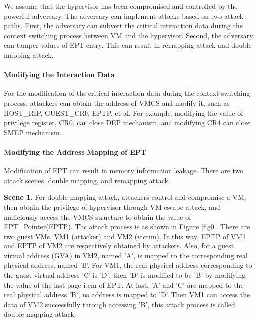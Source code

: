 \documentclass[conference]{IEEEtran}
\begin{document}

We assume that the hypervisor has been compromised and controlled by the powerful adversary. The adversary can implement attacks based on two attack paths. 
First, the adversary can subvert the critical interaction data during the context switching process between VM and the hypervisor. Second, the adversary can tamper values of EPT entry. This can result in remapping attack and double mapping attack.

\paragraph{Modifying the Interaction Data}
For the modification of the critical interaction data during the context switching process, attackers can obtain the address of VMCS
and modify it, such as HOST\_RIP, GUEST\_CR0, EPTP, et al. For example,
modifying the value of privilege register, CR0, can close DEP mechanism, and modifying CR4 can close SMEP mechanism.

\paragraph{Modifying the Address Mapping of EPT}
Modification of EPT can result in memory information leakage. There are two attack scenes, double mapping, and remapping attack.

\textbf{Scene 1.} 
    For double mapping attack, attackers control and compromise a VM, then obtain the privilege of hypervisor through VM escape attack, and maliciously access the VMCS structure to obtain the value of EPT\_Pointer(EPTP). The attack process is as shown in Figure \ref{fig0}. There are two guest VMs, VM1 (attacker) and VM2 (victim). In this way, EPTP of VM1 and EPTP of VM2 are respectively obtained by attackers. Also, for a guest virtual address (GVA) in VM2, named 'A', is mapped to the corresponding real physical address, named 'B'. For VM1, the real physical address corresponding to the guest virtual address 'C' is 'D', then 'D' is modified to be 'B' by modifying the value of the last page item of EPT. At last, 'A' and 'C' are mapped to the real physical address 'B', no address is mapped to 'D'. Then VM1 can access the data of VM2 successfully through accessing 'B', this attack process is called double mapping attack.
\end{document}
